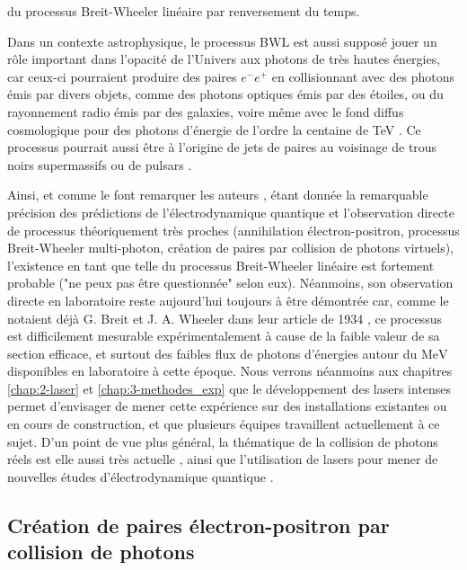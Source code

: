 \begin{refsection}
du processus Breit-Wheeler linéaire par renversement du temps.

Dans un contexte astrophysique, le processus BWL est aussi supposé jouer un rôle important dans l'opacité de l'Univers aux photons de très hautes énergies, car ceux-ci pourraient produire des paires $e^-e^+$ en collisionnant avec des photons émis par divers objets, comme des photons optiques émis par des étoiles, ou du rayonnement radio émis par des galaxies, voire même avec le fond diffus cosmologique pour des photons d'énergie de l'ordre la centaine de TeV \parencite{diehl_2001, nikishov_1961, gould_1967a}. Ce processus pourrait aussi être à l'origine de jets de paires au voisinage de trous noirs supermassifs \parencite{bonometto_1971} ou de pulsars \parencite{zhang_1998}.

Ainsi, et comme le font remarquer les auteurs \cite{gould_1967}, étant donnée la remarquable précision des prédictions de l'électrodynamique quantique et l'observation directe de processus théoriquement très proches (annihilation électron-positron, processus Breit-Wheeler multi-photon, création de paires par collision de photons virtuels), l'existence en tant que telle du processus Breit-Wheeler linéaire est fortement probable ("ne peux pas être questionnée" selon eux). Néanmoins, son observation directe en laboratoire reste aujourd'hui toujours à être démontrée car, comme le notaient déjà G. Breit et J. A. Wheeler dans leur article de 1934 \parencite{breit_1934}, ce processus est difficilement mesurable expérimentalement à cause de la faible valeur de sa section efficace, et surtout des faibles flux de photons d'énergies autour du $\si{\MeV}$ disponibles en laboratoire à cette époque. Nous verrons néanmoins aux chapitres \ref{chap:2-laser} et \ref{chap:3-methodes_exp} que le développement des lasers intenses permet d'envisager de mener cette expérience sur des installations existantes ou en cours de construction, et que plusieurs équipes travaillent actuellement à ce sujet. D'un point de vue plus général, la thématique de la collision de photons réels est elle aussi très actuelle \parencite{marklund_2006, chou_2018, takahashi_2019}, ainsi que l'utilisation de lasers pour mener de nouvelles études d'électrodynamique quantique \parencite{dipiazza_2012, zhang_2020}. 

\subsection{Création de paires électron-positron par collision de photons}


\end{refsection}
